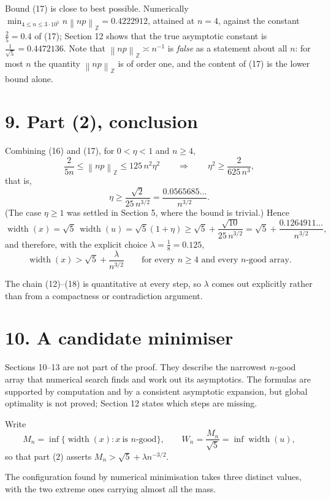 \documentclass[12pt]{article}
\newcommand{\W}{\operatorname{width}}
\newcommand{\ZZ}{\mathbb Z}
\newcommand{\normZ}[1]{\left\lVert #1\right\rVert_{\ZZ}}
\begin{document}
Bound (17) is close to best possible. Numerically
\(\min_{4\le n\le3\cdot10^5}n\normZ{np}=0.4222912\), attained at
\(n=4\), against the constant \(\frac25=0.4\) of (17); Section 12 shows
that the true asymptotic constant is \(\frac1{\sqrt5}=0.4472136\).
Note that \(\normZ{np}\asymp n^{-1}\) is \emph{false} as a statement about
all \(n\): for most \(n\) the quantity \(\normZ{np}\) is of order one, and
the content of (17) is the lower bound alone.

\section*{9. Part (2), conclusion}

Combining (16) and (17), for \(0<\eta<1\) and \(n\ge4\),
\[
\frac{2}{5n}\le\normZ{np}\le125\,n^2\eta^2
\qquad\Longrightarrow\qquad
\eta^2\ge\frac{2}{625\,n^3},
\]
that is,
\[
\boxed{\displaystyle \eta\ge\frac{\sqrt2}{25\,n^{3/2}}
=\frac{0.0565685\ldots}{n^{3/2}} .}
\tag{18}
\]
(The case \(\eta\ge1\) was settled in Section 5, where the bound is
trivial.) Hence
\[
\W(x)=\sqrt5\,\W(u)=\sqrt5(1+\eta)
\ge\sqrt5+\frac{\sqrt{10}}{25\,n^{3/2}}
=\sqrt5+\frac{0.1264911\ldots}{n^{3/2}},
\]
and therefore, with the explicit choice \(\lambda=\frac18=0.125\),
\[
\boxed{\displaystyle
\W(x)>\sqrt5+\frac{\lambda}{n^{3/2}}
\qquad\text{for every }n\ge4\text{ and every }n\text{-good array}. }
\]

The chain (12)--(18) is quantitative at every step, so \(\lambda\) comes
out explicitly rather than from a compactness or contradiction
argument.



\section*{10. A candidate minimiser}

Sections 10--13 are not part of the proof. They describe the narrowest
\(n\)-good array that numerical search finds and work out its
asymptotics. The formulas are supported by computation and by a
consistent asymptotic expansion, but global optimality is not proved;
Section 12 states which steps are missing.

Write
\[
M_n=\inf\bigl\{\W(x):x\ \text{is }n\text{-good}\bigr\},
\qquad
W_n=\frac{M_n}{\sqrt5}=\inf\W(u),
\]
so that part (2) asserts \(M_n>\sqrt5+\lambda n^{-3/2}\).

The configuration found by numerical minimisation takes three distinct
values, with the two extreme ones carrying almost all the mass.
\end{document}
